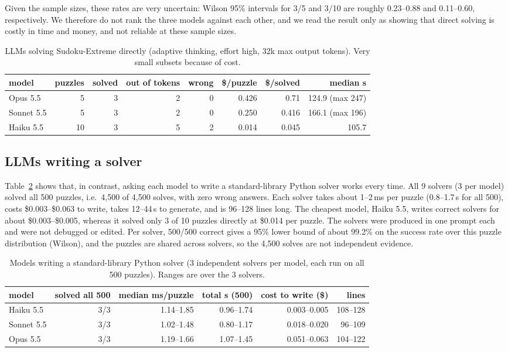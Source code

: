 \documentclass{article} %
\begin{document}
Given the sample sizes, these rates are very uncertain: Wilson 95\% intervals for 3/5 and 3/10 are roughly 0.23--0.88 and 0.11--0.60, respectively. We therefore do not rank the three models against each other, and we read the result only as showing that direct solving is costly in time and money, and not reliable at these sample sizes.

\begin{table}[t]
\centering
\caption{LLMs solving Sudoku-Extreme directly (adaptive thinking, effort high, 32k max output tokens). Very small subsets because of cost.}
\label{tab:direct}
\small
\begin{tabular}{lrrrrrrr}
\toprule
model & puzzles & solved & out of tokens & wrong & \$/puzzle & \$/solved & median s \\
\midrule
Opus 5.5 & 5 & 3 & 2 & 0 & 0.426 & 0.71 & 124.9 (max 247) \\
Sonnet 5.5 & 5 & 3 & 2 & 0 & 0.250 & 0.416 & 166.1 (max 196) \\
Haiku 5.5 & 10 & 3 & 5 & 2 & 0.014 & 0.045 & 105.7 \\
\bottomrule
\end{tabular}
\end{table}

\subsection{LLMs writing a solver}
Table~\ref{tab:code} shows that, in contrast, asking each model to write a standard-library Python solver works every time. All 9 solvers (3 per model) solved all 500 puzzles, i.e.\ 4{,}500 of 4{,}500 solves, with zero wrong answers. Each solver takes about 1--2\,ms per puzzle (0.8--1.7\,s for all 500), costs \$0.003--\$0.063 to write, takes 12--44\,s to generate, and is 96--128 lines long. The cheapest model, Haiku 5.5, writes correct solvers for about \$0.003--\$0.005, whereas it solved only 3 of 10 puzzles directly at \$0.014 per puzzle. The solvers were produced in one prompt each and were not debugged or edited. Per solver, 500/500 correct gives a 95\% lower bound of about 99.2\% on the success rate over this puzzle distribution (Wilson), and the puzzles are shared across solvers, so the 4{,}500 solves are not independent evidence.

\begin{table}[t]
\centering
\caption{Models writing a standard-library Python solver (3 independent solvers per model, each run on all 500 puzzles). Ranges are over the 3 solvers.}
\label{tab:code}
\small
\begin{tabular}{lrrrrr}
\toprule
model & solved all 500 & median ms/puzzle & total s (500) & cost to write (\$) & lines \\
\midrule
Haiku 5.5 & 3/3 & 1.14--1.85 & 0.96--1.74 & 0.003--0.005 & 108--128 \\
Sonnet 5.5 & 3/3 & 1.02--1.48 & 0.80--1.17 & 0.018--0.020 & 96--109 \\
Opus 5.5 & 3/3 & 1.19--1.66 & 1.07--1.45 & 0.051--0.063 & 104--122 \\
\bottomrule
\end{tabular}
\end{table}
\end{document}
